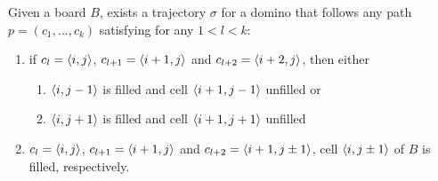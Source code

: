\begin{lemma0} 
  Given a board $B$, exists a trajectory $\sigma$ for a domino that follows any path $p = (c_1,\dots , c_k) $ satisfying for any $ 1 < l < k $:
\begin{enumerate}
  \item if \(c_l = \cell\), \( c_{l+1} = \cell[i+1][j] \) and \( c_{l+2} = \cell[i+2][j] \), then either 
    \begin{enumerate}
      \item $\cell[i][j-1]$ is filled and cell $\cell[i+1][j-1]$ unfilled or \label{dom:path:up-left}
      \item $\cell[i][j+1]$ is filled and cell $\cell[i+1][j+1]$ unfilled \label{dom:path:up-right}
    \end{enumerate}
  \item $  c_l = \cell$, \( c_{l+1} = \cell[i+1][j] \) and \( c_{l+2} = \cell[i+1][j \pm 1] \), cell $\cell[i][j \pm 1]$ of $B$ is filled, respectively. \label{dom:path:turn} 
\end{enumerate}
\end{lemma0}
